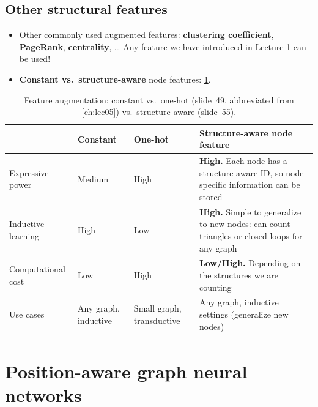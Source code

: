 \subsection{Other structural features}\label{sec:lec07-otherfeat}

\begin{itemize}
  \item Other commonly used augmented features: \textbf{clustering coefficient},
    \textbf{PageRank}, \textbf{centrality}, \dots{} Any feature we have
    introduced in Lecture 1 can be used!
  \item \textbf{Constant vs.\ structure-aware} node features:
    \cref{tab:lec07-structfeat}.
\end{itemize}

\begin{table}[htbp]
  \centering\small
  \caption{Feature augmentation: constant vs.\ one-hot (slide~49, abbreviated
  from \cref{ch:lec05}) vs.\ structure-aware (slide~55).}
  \label{tab:lec07-structfeat}
  \renewcommand{\arraystretch}{1.15}
  \begin{tabularx}{\textwidth}{@{}>{\raggedright\arraybackslash}p{2.3cm}
      >{\raggedright\arraybackslash}p{2.2cm}>{\raggedright\arraybackslash}p{2.2cm}
      >{\raggedright\arraybackslash}X@{}}
    \toprule
    & Constant & One-hot & Structure-aware node feature\\
    \midrule
    Expressive power & Medium & High & \textbf{High.} Each node has a
      structure-aware ID, so node-specific information can be stored\\
    Inductive learning & High & Low & \textbf{High.} Simple to generalize to new
      nodes: can count triangles or closed loops for any graph\\
    Computational cost & Low & High & \textbf{Low/High.} Depending on the
      structures we are counting\\
    Use cases & Any graph, inductive & Small graph, transductive & Any graph,
      inductive settings (generalize new nodes)\\
    \bottomrule
  \end{tabularx}
\end{table}

\section{Position-aware graph neural networks}\label{sec:lec07-pos}

